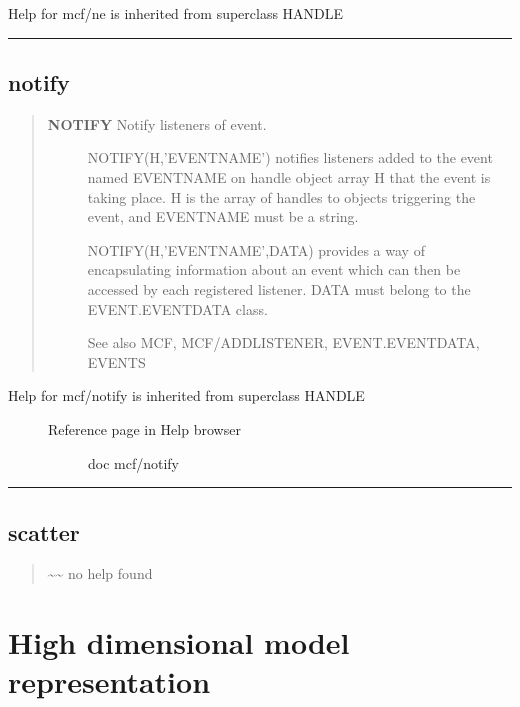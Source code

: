 \documentclass[letterpaper,10pt,english]{sphinxmanual}
\begin{document}
Help for mcf/ne is inherited from superclass HANDLE


\bigskip\hrule{}\bigskip



\section{notify}
\label{classes/utils/@mcf/mcf:notify}\label{classes/utils/@mcf/mcf:id17}\begin{quote}
\begin{description}
\item[{\textbf{NOTIFY}   Notify listeners of event.}] \leavevmode
NOTIFY(H,'EVENTNAME') notifies listeners added to the event named
EVENTNAME on handle object array H that the event is taking place.
H is the array of handles to objects triggering the event, and
EVENTNAME must be a string.

NOTIFY(H,'EVENTNAME',DATA) provides a way of encapsulating information
about an event which can then be accessed by each registered listener.
DATA must belong to the EVENT.EVENTDATA class.

See also MCF, MCF/ADDLISTENER, EVENT.EVENTDATA, EVENTS

\end{description}
\end{quote}
\begin{description}
\item[{Help for mcf/notify is inherited from superclass HANDLE}] \leavevmode\begin{description}
\item[{Reference page in Help browser}] \leavevmode
doc mcf/notify

\end{description}

\end{description}


\bigskip\hrule{}\bigskip



\section{scatter}
\label{classes/utils/@mcf/mcf:id18}\label{classes/utils/@mcf/mcf:scatter}\begin{quote}

\textasciitilde{}\textasciitilde{} no help found
\end{quote}


\chapter{High dimensional model representation}
\label{classes/utils/@hdmr/hdmr::doc}\label{classes/utils/@hdmr/hdmr:high-dimensional-model-representation}
\end{document}
